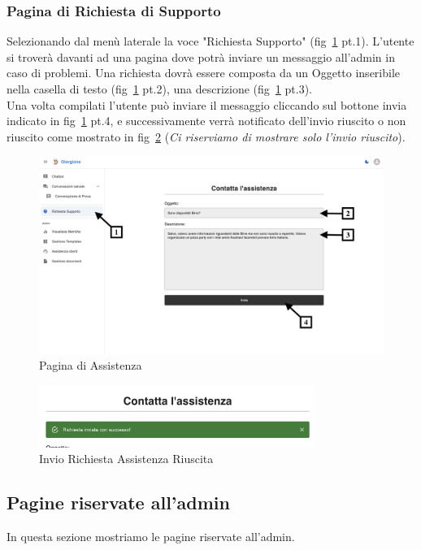 \subsubsection{Pagina di Richiesta di Supporto}
Selezionando dal menù laterale la voce "Richiesta Supporto" (fig~\ref{fig:Pagina di Assistenza} pt.1). L'utente si troverà davanti ad una pagina dove potrà inviare un messaggio all'admin in caso di problemi.
Una richiesta dovrà essere composta da un Oggetto inseribile nella casella di testo (fig~\ref{fig:Pagina di Assistenza} pt.2), una descrizione (fig~\ref{fig:Pagina di Assistenza} pt.3).\\
Una volta compilati l'utente può inviare il messaggio cliccando sul bottone invia indicato in fig~\ref{fig:Pagina di Assistenza} pt.4, e successivamente verrà notificato dell'invio riuscito o non riuscito come mostrato in fig~\ref{fig:InvioRiuscito} (\textit{Ci riserviamo di mostrare solo l'invio riuscito}).
\begin{figure}[h!]
    \centering
    \includegraphics[width=\textwidth]{./img/RichiestaAssistenza1.png}
    \caption{Pagina di Assistenza}
    \label{fig:Pagina di Assistenza}
\end{figure}
\begin{figure}[h!]
    \centering
    \includegraphics[width=0.8\textwidth]{./img/RichiestaAssistenza2.png}
    \caption{Invio Richiesta Assistenza Riuscita}
    \label{fig:InvioRiuscito}
\end{figure}

\subsection{Pagine riservate all'admin}
In questa sezione mostriamo le pagine riservate all'admin.


